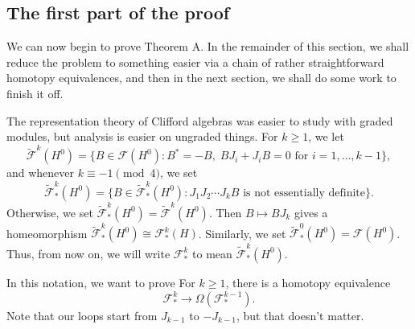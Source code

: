 \documentclass{shortart}
\theoremstyle{definition}
\newenvironment{customthm}[1]{\renewcommand\theinnercustomthm{#1}\innercustomthm}{\endinnercustomthm}
\begin{document}
\subsection{The first part of the proof}
We can now begin to prove Theorem A. In the remainder of this section, we shall reduce the problem to something easier via a chain of rather straightforward homotopy equivalences, and then in the next section, we shall do some work to finish it off.

The representation theory of Clifford algebras was easier to study with graded modules, but analysis is easier on ungraded things. For $k \geq 1$, we let
\[
  \tilde{\mathcal{F}}^k(H^0) = \{B \in \mathcal{F}(H^0): B^* = -B,\; B J_i + J_i B = 0\text{ for }i = 1, \ldots, k - 1\},
\]
and whenever $k \equiv -1\pmod 4$, we set
\[
  \tilde{\mathcal{F}}^k_*(H^0) = \{B \in \tilde{\mathcal{F}}^k_*(H^0): J_1 J_2 \cdots J_kB \text{ is not essentially definite}\}.
\]
Otherwise, we set $\tilde{\mathcal{F}}^k_*(H^0) = \tilde{\mathcal{F}}^k(H^0)$. Then $B \mapsto BJ_k$ gives a homeomorphism $\tilde{\mathcal{F}}^k_*(H^0) \cong \mathcal{F}^k_*(H)$. Similarly, we set $\tilde{\mathcal{F}}^0_*(H^0) = \mathcal{F}(H^0)$. Thus, from now on, we will write $\mathcal{F}^k_*$ to mean $\tilde{\mathcal{F}}^k_*(H^0)$.

In this notation, we want to prove
\begin{customthm}{A'}
  For $k \geq 1$, there is a homotopy equivalence
  \[
    \mathcal{F}^k_* \to \Omega(\mathcal{F}^{k - 1}_*).
  \]
\end{customthm}
Note that our loops start from $J_{k - 1}$ to $-J_{k - 1}$, but that doesn't matter.
%
%
\end{document}
